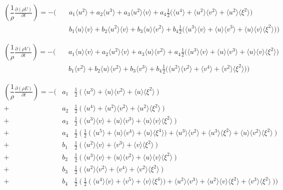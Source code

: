 \documentclass[
	pdftex,             %
	12pt,				%
	a4paper,		   	%
	english,				%
	oneside,			%
]{article}
\newcommand{\mom}[1]{\langle #1 \rangle}
\begin{document}
\begin{eqnarray*}
\left( \dfrac{1}{\rho} \frac{\partial (\rho U)}{\partial t} \right)
=
-%
\Bigg(
&~&a_1 \mom{u^2} + a_2 \mom{u^3} + a_3 \mom{u^2}\mom{v}
+  a_4 \frac{1}{2} \Big( \mom{u^4} + \mom{u^2}\mom{v^2} + \mom{u^2}\mom{\xi^2} \Big)
\\
&~&b_1 \mom{u}\mom{v} + b_2 \mom{u^2}\mom{v} + b_3 \mom{u}\mom{v^2}
+  b_4 \frac{1}{2} \Big( \mom{u^3}\mom{v} + \mom{u}\mom{v^3} + \mom{u}\mom{v}\mom{\xi^2} \Big)
\Bigg)
\end{eqnarray*}

\begin{eqnarray*}
\left( \dfrac{1}{\rho} \frac{\partial (\rho V)}{\partial t} \right)
=
-%
\Bigg(
&~&a_1 \mom{u}\mom{v} + a_2 \mom{u^2}\mom{v} + a_3 \mom{u}\mom{v^2}
+  a_4 \frac{1}{2} \Big( \mom{u^3}\mom{v} + \mom{u}\mom{v^3} + \mom{u}\mom{v}\mom{\xi^2} \Big)
\\
&~&b_1 \mom{v^2} + b_2 \mom{u}\mom{v^2} + b_3 \mom{v^3}
+  b_4 \frac{1}{2} \Big( \mom{u^2}\mom{v^2} + \mom{v^4} + \mom{v^2}\mom{\xi^2} \Big)
\Bigg)
\end{eqnarray*}

\begin{eqnarray*}
\left( \dfrac{1}{\rho} \frac{\partial (\rho E)}{\partial t} \right)
=
-%
\Bigg(
 &a_1& \frac{1}{2}~ \Big(~ \mom{u^3} + \mom{u}\mom{v^2} + \mom{u}\mom{\xi^2} ~\Big) \\
+&a_2& \frac{1}{2}~ \Big(~ \mom{u^4} + \mom{u^2}\mom{v^2} + \mom{u^2}\mom{\xi^2} ~\Big) \\
+&a_3& \frac{1}{2}~ \Big(~ \mom{u^3}\mom{v} + \mom{u}\mom{v^3} + \mom{u}\mom{v}\mom{\xi^2} ~\Big) \\
+&a_4& \frac{1}{2}~ \Big(~ \frac{1}{2}~
					\big(~ \mom{u^5} + \mom{u}\mom{v^4} + \mom{u}\mom{\xi^4} \big)
						 + \mom{u^3}\mom{v^2} + \mom{u^3}\mom{\xi^2} + \mom{u}\mom{v^2}\mom{\xi^2}
					~\Big)
\\
+&b_1& \frac{1}{2}~ \Big(~ \mom{u^2}\mom{v} + \mom{v^3} + \mom{v}\mom{\xi^2} ~\Big) \\
+&b_2& \frac{1}{2}~ \Big(~ \mom{u^3}\mom{v} + \mom{u}\mom{v^2} + \mom{u}\mom{v}\mom{\xi^2} ~\Big) \\
+&b_3& \frac{1}{2}~ \Big(~ \mom{u^2}\mom{v^2} + \mom{v^4} + \mom{v^2}\mom{\xi^2} ~\Big) \\
+&b_4& \frac{1}{2}~ \Big(~ \frac{1}{2}~
					\big(~  \mom{u^4}\mom{v} +\mom{v^5} + \mom{v}\mom{\xi^4} \big)
						 + \mom{u^2}\mom{v^3} + \mom{u^2}\mom{v}\mom{\xi^2} + \mom{v^3}\mom{\xi^2}
					~\Big)
\Bigg)
\end{eqnarray*}
\end{document}
